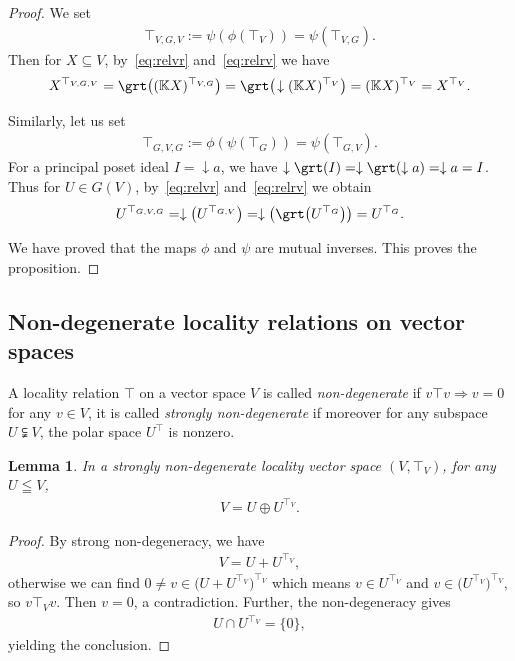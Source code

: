 \documentclass[10pt,a4paper]{amsart}
\numberwithin{equation}{section}
\newcommand{\K}{\mathbb{K}}
\newcommand{\loc}{locality\xspace}
\newtheorem{lemma}[Theorem]{Lemma}
\begin{document}
\begin {proof}
We set
\begin{gather*}
\top_{V,G,V}:=\psi(\phi(\top_V))=\psi(\top_{V,G}).
\end{gather*}
Then for $X\subseteq V$, by~\eqref{eq:relvr} and~\eqref{eq:relrv} we have
\begin{gather*}
X^{\top_{V,G,V}}= \grt \big( (\K X)^{\top_{V,G}}\big) =\grt \big (\!\downarrow (\K X)^{\top_V}\big)
=(\K X)^{\top_V} = X^{\top_V}.
\end{gather*}

Similarly, let us set
\begin{gather*}
\top_{G,V,G}:=\phi(\psi(\top_G)) = \psi(\top_{G,V}).
\end{gather*}
For a principal poset ideal $I=\downarrow a$, we have $\downarrow \grt (I) = \downarrow \grt (\downarrow a) = \downarrow a=I$.
Thus for $U\in G(V)$, by~\eqref{eq:relvr} and~\eqref{eq:relrv} we obtain
\begin{gather*}
U^{\top_{G,V,G}} = \downarrow \big(U^{\top_{G,V}}\big) = \downarrow \big (\grt \big(U^{\top_G}\big)\big) =U^{\top_G}.
\end{gather*}

We have proved that the maps $\phi$ and $\psi$ are mutual inverses. This proves the proposition.
\end{proof}

\subsection {Non-degenerate locality relations on vector spaces}
\begin{Definition}
\label{de:vpproper}
A \loc relation $\top$ on a vector space $V$ is called \emph{non-degenerate} if $v\top v \Rightarrow v=0$ for any $v\in V$,
it is called \emph{strongly non-degenerate} if moreover for any subspace $ U \subsetneqq
V$, the polar space $U^\top $ is nonzero.
\end{Definition}

\begin {lemma}%
In a strongly non-degenerate locality vector space $(V, \top _V)$, for any $U\leqq V$,
\begin{gather*}%
V=U\oplus U^{\top _V}.
\end{gather*}
\end{lemma}

\begin {proof}
By strong non-degeneracy, we have
\begin{gather*}
V=U+U^{\top _V},
\end{gather*}
otherwise we can find $0\neq v\in \big(U+U^{\top _V}\big)^{\top _V}$ which means $v\in U^{\top _V}$ and $v\in \big(U^{\top_V}\big)^{\top_V}$, so $v\top _V v$. Then $v=0$, a contradiction. Further, the non-degeneracy gives
\begin{gather*}
U\cap U^{\top _V}=\{0\},\end{gather*}
yielding the conclusion.
\end {proof}
\end{document}
